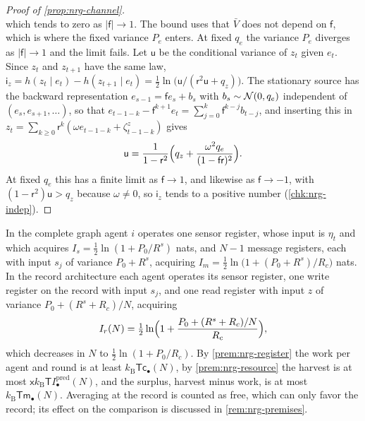 \begin{proof}[Proof of \cref{prop:nrg-channel}]
\[\]
which tends to zero as $\vert\mathsf f\vert\to1$. The bound uses that $\bar V$ does not depend on $\mathsf f$, which is where the fixed variance $P_e$ enters. At fixed $q_e$ the variance $P_e$ diverges as $\vert\mathsf f\vert\to1$ and the limit fails. Let $\mathsf u$ be the conditional variance of $z_t$ given $e_t$. Since $z_t$ and $z_{t+1}$ have the same law, $\mathsf i_z=h(z_t\mid e_t)-h(z_{t+1}\mid e_t)=\tfrac12\ln\bigl(\mathsf u/(\mathsf r^2\mathsf u+q_z)\bigr)$. The stationary source has the backward representation $e_{s-1}=\mathsf fe_s+b_s$ with $b_s\sim\mathcal{N}(0,q_e)$ independent of $(e_s,e_{s+1},\dots)$, so that $e_{t-1-k}-\mathsf f^{k+1}e_t=\sum_{j=0}^k\mathsf f^{k-j}b_{t-j}$, and inserting this in $z_t=\sum_{k\ge0}\mathsf r^k(\omega e_{t-1-k}+\zeta^z_{t-1-k})$ gives
\[
\mathsf u=\frac{1}{1-\mathsf r^2}\Bigl(q_z+\frac{\omega^2q_e}{(1-\mathsf f\mathsf r)^2}\Bigr).
\]
At fixed $q_e$ this has a finite limit as $\mathsf f\to1$, and likewise as $\mathsf f\to-1$, with $(1-\mathsf r^2)\mathsf u>q_z$ because $\omega\ne0$, so $\mathsf i_z$ tends to a positive number (\cref{chk:nrg-indep}).
\end{proof}

\begin{remark}\label{rem:nrg-accounting}
In the complete graph agent $i$ operates one sensor register, whose input is $\eta_t$ and which acquires $I_s=\tfrac12\ln(1+P_0/R^s)$ nats, and $N-1$ message registers, each with input $s_j$ of variance $P_0+R^s$, acquiring $I_m=\tfrac12\ln\bigl(1+(P_0+R^s)/R_c\bigr)$ nats. In the record architecture each agent operates its sensor register, one write register on the record with input $s_j$, and one read register with input $z$ of variance $P_0+(R^s+R_c)/N$, acquiring
\[
I_r(N)=\tfrac12\ln\Bigl(1+\frac{P_0+(R^s+R_c)/N}{R_c}\Bigr),
\]
which decreases in $N$ to $\tfrac12\ln(1+P_0/R_c)$. By \cref{prem:nrg-register} the work per agent and round is at least $k_{\mathrm B}\mathsf T\mathsf c_\bullet(N)$, by \cref{prem:nrg-resource} the harvest is at most $\mathsf xk_{\mathrm B}\mathsf TI^{\mathrm{pred}}_\bullet(N)$, and the surplus, harvest minus work, is at most $k_{\mathrm B}\mathsf T\mathsf m_\bullet(N)$. Averaging at the record is counted as free, which can only favor the record; its effect on the comparison is discussed in \cref{rem:nrg-premises}.
\end{remark}

